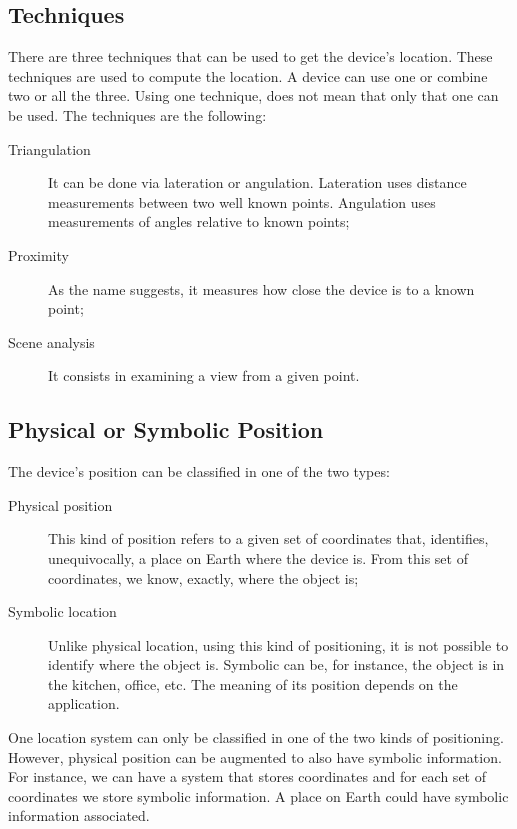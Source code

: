 \subsection{Techniques}
\label{sub:background_techniques}
There are three techniques that can be used to get the device's location.
These techniques are used to compute the location.
A device can use one or combine two or all the three.
Using one technique, does not mean that only that one can be used.
The techniques are the following:
\begin{description}
  \item[Triangulation] It can be done via lateration or angulation. Lateration uses distance measurements between two well known points.
  Angulation uses measurements of angles relative to known points;
  \item[Proximity] As the name suggests, it measures how close the device is to a known point;
  \item[Scene analysis] It consists in examining a view from a given point.
\end{description}

\subsection{Physical or Symbolic Position}
\label{sub:background_physical_or_symbolic_position}
The device's position can be classified in one of the two types:
\begin{description}
  \item[Physical position] This kind of position refers to a given set of coordinates that, identifies, unequivocally, a place on Earth where the device is. From this set of coordinates, we know, exactly, where the object is;
  \item[Symbolic location] Unlike physical location, using this kind of positioning, it is not possible to identify where the object is. Symbolic can be, for instance, the object is in the kitchen, office, etc. The meaning of its position depends on the application.
\end{description}

One location system can only be classified in one of the two kinds of positioning.
However, physical position can be augmented to also have symbolic information.
For instance, we can have a system that stores coordinates and for each set of coordinates we store symbolic information.
A place on Earth could have symbolic information associated.

